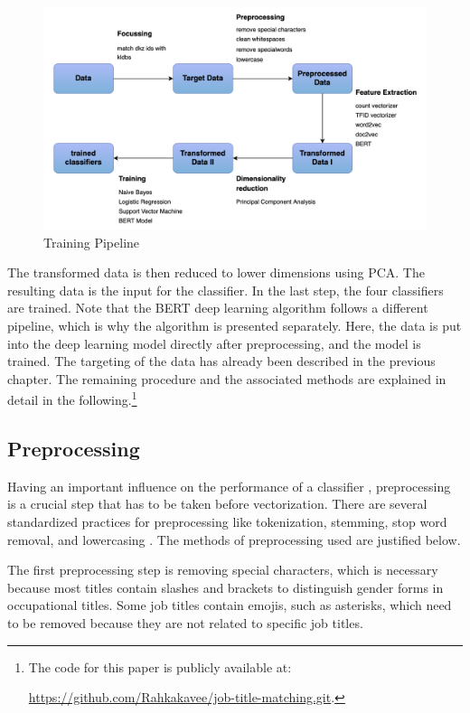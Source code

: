 \documentclass[12pt, a4paper, titlepage]{article}
\begin{document}
\begin{figure}[hb!]
  \center
  \includegraphics[scale=0.5]{pipeline_MA.png}
  \caption{\label{fig: F8} Training Pipeline}
\end{figure}

The transformed data is then reduced to lower dimensions using \ac{PCA}. The resulting data is the input for the classifier. In the last step, the four classifiers are trained. Note that the \ac{BERT} deep learning algorithm follows a different pipeline, which is why the algorithm is presented separately. Here, the data is put into the deep learning model directly after preprocessing, and the model is trained. The targeting of the data has already been described in the previous chapter. The remaining procedure and the associated methods are explained in detail in the following.\footnote{The code for this paper is publicly available at:

\url{https://github.com/Rahkakavee/job-title-matching.git}.} 

\subsection{Preprocessing}
Having an important influence on the performance of a classifier \citep{uysal2014, hacohen2020, gonccalves2005}, preprocessing is a crucial step that has to be taken before vectorization. There are several standardized practices for preprocessing like tokenization, stemming, stop word removal, and lowercasing \citep{alsmadi2019}. The methods of preprocessing used are justified below.

The first preprocessing step is removing special characters, which is necessary because most titles contain slashes and brackets to distinguish gender forms in occupational titles. Some job titles contain emojis, such as asterisks, which need to be removed because they are not related to specific job titles. 
\end{document}
